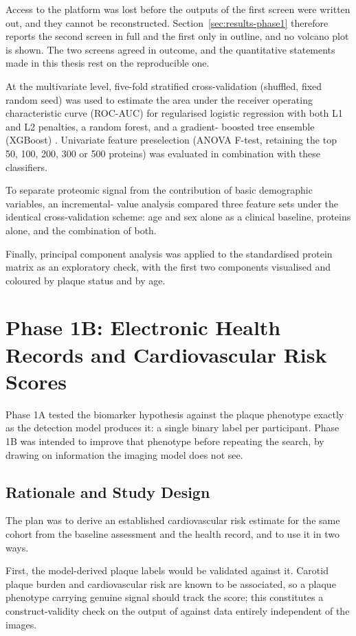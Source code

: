 Access to the platform was lost before the outputs of the first screen were written out, and
they cannot be reconstructed. Section~\ref{sec:results-phase1} therefore reports the second screen in
full and the first only in outline, and no volcano plot is shown. The two screens agreed in
outcome, and the quantitative statements made in this thesis rest on the reproducible one.

At the multivariate level, five-fold stratified cross-validation (shuffled, fixed random seed) was
used to estimate the area under the receiver operating characteristic curve (ROC-AUC) for
regularised logistic regression with both L1 and L2 penalties, a random forest, and a gradient-
boosted tree ensemble (XGBoost) \cite{chen2016xgboost}. Univariate feature preselection
(ANOVA F-test, retaining the top 50, 100, 200, 300 or 500 proteins) was evaluated in combination
with these classifiers.

To separate proteomic signal from the contribution of basic demographic variables, an incremental-
value analysis compared three feature sets under the identical cross-validation scheme: age and
sex alone as a clinical baseline, proteins alone, and the combination of both.

Finally, principal component analysis was applied to the standardised protein matrix as an
exploratory check, with the first two components visualised and coloured by plaque status and by
age.

\section{Phase 1B: Electronic Health Records and Cardiovascular Risk Scores}
\label{sec:phase1b}

Phase 1A tested the biomarker hypothesis against the plaque phenotype exactly as the detection
model produces it: a single binary label per participant. Phase 1B was intended to improve that
phenotype before repeating the search, by drawing on information the imaging model does not see.

\subsection{Rationale and Study Design}
The plan was to derive an established cardiovascular risk estimate for the same cohort from the
baseline assessment and the health record, and to use it in two ways.

First, the model-derived plaque labels would be validated against it. Carotid plaque burden and
cardiovascular risk are known to be associated, so a plaque phenotype carrying genuine signal
should track the score; this constitutes a construct-validity check on the output of
\textcite{omarov2024deep} against data entirely independent of the images.

